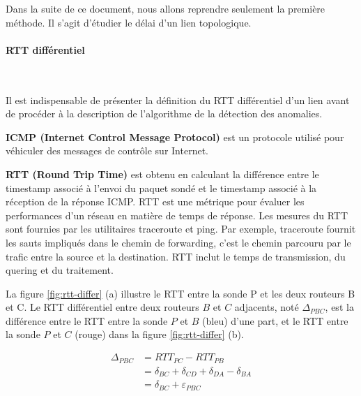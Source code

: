 Dans la suite de ce document, nous allons reprendre seulement la première méthode.  Il s'agit d'étudier le délai d'un lien topologique.







\paragraph{RTT différentiel}~

Il est indispensable de présenter la définition du RTT différentiel d'un lien avant de procéder à la description de l'algorithme de la détection des anomalies. 


\begin{tcolorbox}
	
	\textbf{ICMP (Internet Control Message Protocol)}  est un protocole utilisé pour véhiculer des messages de contrôle sur Internet.
	
	\textbf{RTT (Round Trip Time)} est obtenu en calculant la différence entre le timestamp associé à l'envoi du paquet sondé  et le timestamp associé à la réception de la réponse ICMP. RTT est une métrique pour évaluer les performances d'un réseau en matière de temps de réponse. Les mesures du RTT sont fournies par les utilitaires traceroute et ping. Par exemple, traceroute fournit les sauts impliqués dans le  chemin de forwarding, c'est le chemin parcouru par le trafic entre la source et la destination.  RTT inclut le temps de transmission, du quering et  du traitement. 
\end{tcolorbox}

La figure 	\ref{fig:rtt-differ} (a)  illustre le RTT entre la sonde P et les deux routeurs B et C. Le RTT différentiel  entre deux routeurs $B$ et $C$ adjacents, noté $\Delta_{PBC}$, est la différence entre le RTT entre la sonde $P$ et $B$ (bleu) d'une part, et le RTT entre la sonde $P$ et $C$ (rouge) dans la figure 	\ref{fig:rtt-differ} (b). 

\begin{align*}
\Delta_{PBC} &= RTT_{PC} - RTT_{PB} \\
&= \delta_{BC} + \delta_{CD} + \delta_{DA}  - \delta_{BA} \\
&= \delta_{BC} + \varepsilon_{PBC}
\end{align*}

